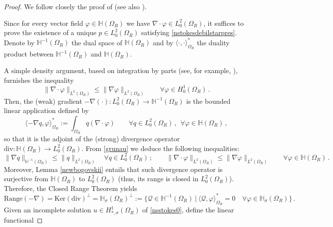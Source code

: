 \documentclass[a4paper,11pt]{article}
\numberwithin{equation}{section}
\numberwithin{figure}{section}
\begin{document}
\begin{proof} We follow closely the proof of \cite[Theorem III.5.3]{galdi2011introduction} (see also \cite[Lemma 2.1]{girault2012finite}).
	
Since for every vector field $\varphi \in \mathbb{H}(\Omega_{R})$ we have  $\nabla \cdot \varphi \in L^2_0(\Omega_{R})$, it suffices to prove the existence of a unique $p \in L_{0}^{2}(\Omega_{R})$ satisfying \eqref{nstokesdebilstarpres}.
Denote
by $\mathbb{H}^{-1}(\Omega_{R})$ the dual space of $\mathbb{H}(\Omega_{R})$ and by $\langle\cdot,\cdot\rangle_{\Omega_{R}}^*$ the
duality product
between $\mathbb{H}^{-1}(\Omega_{R})$ and $\mathbb{H}(\Omega_{R})$.

A simple density argument, based on integration by parts (see, for example, \cite[Lemma 2.1]{gazgruspe2026}), furnishes the inequality
\begin{equation} \label{grunau}
\| \nabla \cdot \varphi \|_{L^{2}(\Omega_{R})} \leq \| \nabla \varphi \|_{L^{2}(\Omega_{R})} \qquad \forall \varphi \in H_{0}^{1}(\Omega_{R}) \, .
\end{equation}
Then, the (weak) gradient
$-\nabla(\cdot): L^2_0(\Omega_{R}) \longrightarrow \mathbb{H}^{-1}(\Omega_{R})$ is the bounded linear application defined by
$$
\langle -\nabla q , \varphi \rangle_{\Omega_{R}}^* := \int_{\Omega_{R}} q (\nabla \cdot \varphi) \qquad \forall q \in L^2_0(\Omega_{R}) \, , \ \ \forall \varphi \in \mathbb{H}(\Omega_{R}) \, ,
$$
so that it is the adjoint of the (strong) divergence operator $\text{div} : \mathbb{H}(\Omega_{R})\longrightarrow L^2_0(\Omega_{R})$. From \eqref{grunau} we deduce the following inequalities:
$$
\| \nabla q \|_{\mathbb{H}^{-1}(\Omega_{R})} \leq \| q \|_{L^{2}(\Omega_{R})} \quad \forall q \in L^2_0(\Omega_{R}) \, ; \qquad \| \nabla \cdot \varphi \|_{L^{2}(\Omega_{R})} \leq \| \nabla \varphi \|_{L^{2}(\Omega_{R})} \qquad \forall \varphi \in \mathbb{H}(\Omega_{R}) \, .
$$
Moreover, Lemma \ref{newbogovskii} entails that such divergence operator is surjective from $\mathbb{H}(\Omega_{R})$ to $L^2_0(\Omega_{R})$ (thus, its range is closed in $L^2_0(\Omega_{R})$). Therefore, the Closed Range Theorem \cite[Chapter VII]{yosida2012functional} yields
$$
\text{Range}(-\nabla) = \text{Ker}(\text{div})^{\perp} = \mathbb{H}_{\sigma}(\Omega_{R})^{\perp} := \{ \mathcal{Q} \in
\mathbb{H}^{-1}(\Omega_{R}) \ | \ \langle \mathcal{Q} , \varphi \rangle_{\Omega_{R}}^* = 0 \quad \forall \varphi \in
\mathbb{H}_{\sigma}(\Omega_{R}) \} \, .
$$
Given an incomplete solution $u \in H^{1}_{*,\sigma}(\Omega_{R})$ of \eqref{nsstokes0}, define the linear functional

\end{proof}
\end{document}
